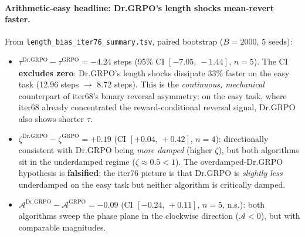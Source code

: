 \paragraph{Arithmetic-easy headline: Dr.GRPO's length shocks mean-revert
faster.}
From \texttt{length\_bias\_iter76\_summary.tsv}, paired bootstrap
($B = 2000$, $5$ seeds):
\begin{itemize}
\item $\tau^{\mathrm{Dr.GRPO}} - \tau^{\mathrm{GRPO}} = -4.24$ steps
      (95\% CI $[-7.05,\,-1.44]$, $n = 5$). The CI \textbf{excludes
      zero}: Dr.GRPO's length shocks dissipate $33\%$ faster on the
      easy task (12.96 steps $\to$ 8.72 steps). This is the
      \emph{continuous, mechanical} counterpart of iter68's binary
      reversal asymmetry: on the easy task, where iter68 already
      concentrated the reward-conditional reversal signal, Dr.GRPO
      also shows shorter $\tau$.
\item $\zeta^{\mathrm{Dr.GRPO}} - \zeta^{\mathrm{GRPO}} = +0.19$
      (CI $[+0.04,\,+0.42]$, $n = 4$): directionally consistent with
      Dr.GRPO being \emph{more damped} (higher $\zeta$),
      but both algorithms sit in the underdamped regime
      ($\zeta \approx 0.5 < 1$). The overdamped-Dr.GRPO hypothesis is
      \textbf{falsified}; the iter76 picture is that Dr.GRPO is
      \emph{slightly less} underdamped on the easy task but neither
      algorithm is critically damped.
\item $\mathcal{A}^{\mathrm{Dr.GRPO}} - \mathcal{A}^{\mathrm{GRPO}} = -0.09$
      (CI $[-0.24,\,+0.11]$, $n = 5$, n.s.): both algorithms sweep the
      phase plane in the clockwise direction ($\mathcal{A} < 0$), but
      with comparable magnitudes.
\end{itemize}


